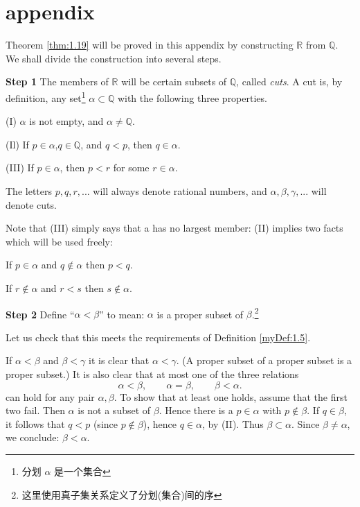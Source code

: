 \section*{appendix}
Theorem \ref{thm:1.19} will be proved in this appendix by constructing $\mathbb{R}$ from $\mathbb{Q}$. We
shall divide the construction into several steps.

\textbf{Step 1} 
The members of $\mathbb{R}$ will be certain subsets of $\mathbb{Q}$, called \emph{cuts}. A cut is,
by definition, any set\footnote{分划 $\alpha$ 是一个集合} $\alpha \subset \mathbb{Q}$ with the following three properties.

(I) $\alpha$ is not empty, and $\alpha \neq \mathbb{Q}$.

(Il) If $p\in \alpha$,$q \in \mathbb{Q}$, and $q <p$, then $q \in \alpha$.

(III) If $p \in \alpha$, then $p <r$ for some $r\in \alpha$.

The letters $p, q, r, ...$ will always denote rational numbers, and $\alpha, \beta, \gamma, ...$
will denote cuts.


Note that (III) simply says that a has no largest member: (II) implies two facts which will be used freely:

If $p\in\alpha$ and $q\not\in\alpha$ then $p<q$.

If $r\not\in \alpha$ and $r<s$ then $s\not\in \alpha$.

\textbf{Step 2}
Define ``$\alpha < \beta$'' to mean: $\alpha$ is a proper subset of $\beta$.\footnote{这里使用真子集关系定义了分划(集合)间的序}

Let us check that this meets the requirements of Definition \ref{myDef:1.5}.

If $\alpha < \beta$ and $\beta < \gamma$ it is clear that $\alpha < \gamma$. (A proper subset of a proper subset is a proper subset.) It is also clear that at most one of the three relations
\begin{equation*}
    \alpha < \beta, \qquad
    \alpha = \beta, \qquad
    \beta < \alpha.
\end{equation*}
can hold for any pair $\alpha, \beta$. To show that at least one holds, assume that the first two fail. Then $\alpha$ is not a subset of $\beta$. Hence there is a $p \in \alpha$ with $p \not\in \beta$. If $q \in \beta$, it follows that $q <p$ (since $p \not\in \beta$), hence $q \in \alpha$, by (II). Thus $\beta \subset \alpha$. Since $\beta \neq \alpha$, we conclude: $\beta < \alpha$.

